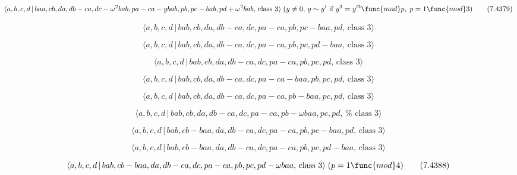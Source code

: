 \documentclass[10pt]{article}
\begin{document}
\begin{equation}
\langle a,b,c,d\,|\,baa,cb,da,db-ca,dc-\omega
^{2}bab,pa-ca-ybab,pb,pc-bab,pd+\omega ^{2}bab,\,\text{class }3\rangle
\;(y\neq 0,\,y\sim y^{\prime }\text{ if }y^{3}=y^{\prime 3}\func{mod}p,\;p=1%
\func{mod}3)  \tag{7.4379}
\end{equation}

\begin{equation}
\langle a,b,c,d\,|\,bab,cb,da,db-ca,dc,pa-ca,pb,pc-baa,pd,\,\text{class }%
3\rangle  \tag{7.4380}
\end{equation}

\begin{equation}
\langle a,b,c,d\,|\,bab,cb,da,db-ca,dc,pa-ca,pb,pc,pd-baa,\,\text{class }%
3\rangle  \tag{7.4381}
\end{equation}

\begin{equation}
\langle a,b,c,d\,|\,bab,cb,da,db-ca,dc,pa-ca,pb,pc,pd,\,\text{class }3\rangle
\tag{7.4382}
\end{equation}

\begin{equation}
\langle a,b,c,d\,|\,bab,cb,da,db-ca,dc,pa-ca-baa,pb,pc,pd,\,\text{class }%
3\rangle  \tag{7.4383}
\end{equation}

\begin{equation}
\langle a,b,c,d\,|\,bab,cb,da,db-ca,dc,pa-ca,pb-baa,pc,pd,\,\text{class }%
3\rangle  \tag{7.4384}
\end{equation}

\begin{equation}
\langle a,b,c,d\,|\,bab,cb,da,db-ca,dc,pa-ca,pb-\omega baa,pc,pd,\,\text{%
class }3\rangle  \tag{7.4385}
\end{equation}

\begin{equation}
\langle a,b,c,d\,|\,bab,cb-baa,da,db-ca,dc,pa-ca,pb,pc-baa,pd,\,\text{class }%
3\rangle  \tag{7.4386}
\end{equation}

\begin{equation}
\langle a,b,c,d\,|\,bab,cb-baa,da,db-ca,dc,pa-ca,pb,pc,pd-baa,\,\text{class }%
3\rangle  \tag{7.4387}
\end{equation}

\begin{equation}
\langle a,b,c,d\,|\,bab,cb-baa,da,db-ca,dc,pa-ca,pb,pc,pd-\omega baa,\,\text{%
class }3\rangle \;(p=1\func{mod}4)  \tag{7.4388}
\end{equation}
\end{document}
